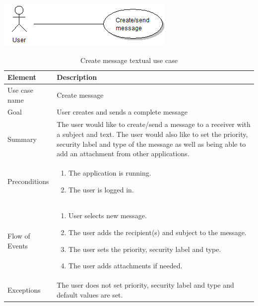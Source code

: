 \begin{table}
\begin{center}
\begin{center}
\includegraphics[width=\textwidth]{create_message}
\end{center}
\begin{tabular}{p{3cm}|p{12cm}} \hline
\textbf{Element} & \textbf{Description} \\ \hline \hline
Use case name & Create message \\
Goal & User creates and sends a complete message \\
Summary &The user would like to create/send a message to a receiver with a subject and text. The user would also like to set the priority, security label and type of the message as well as being able to add an attachment from other applications. \\
Preconditions &
\begin{enumerate}
\item{}The application is running.
\item{}The user is logged in.
\end{enumerate} \\ \hline
Flow of Events &
\begin{enumerate}
\item{}User selects new message.
\item{}The user adds the recipient(s) and subject to the message.
\item{}The user sets the priority, security label and type.
\item{}The user adds attachments if needed.
\end{enumerate} \\ \hline
Exceptions & The user does not set priority, security label and type and default values are set.\\ \hline
\end{tabular}
\end{center}
\caption{Create message textual use case} \label{tab:createmessage}
\end{table}

